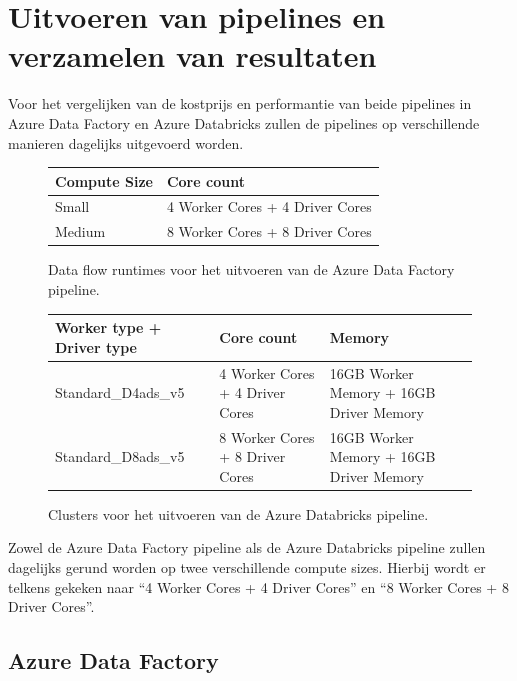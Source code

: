 \chapter{Uitvoeren van pipelines en verzamelen van resultaten}%
\label{ch:uitvoeren}

Voor het vergelijken van de kostprijs en performantie van beide pipelines in Azure Data Factory en Azure Databricks zullen de pipelines op verschillende manieren dagelijks uitgevoerd worden.

\begin{figure}[H]%
    \centering
    \begin{tabularx}{0.9\textwidth}{ |X|X| }
        \hline
        \textbf{Compute Size} & \textbf{Core count} \\
        \hline 
        Small  & 4 Worker Cores + 4 Driver Cores  \\
        \hline
        Medium & 8 Worker Cores + 8 Driver Cores \\
        \hline
    \end{tabularx}
    \caption{Data flow runtimes voor het uitvoeren van de Azure Data Factory pipeline.}
\end{figure}
    
\begin{figure}[H]%
    \centering
    \begin{tabularx}{0.9\textwidth}{ |X|X|X| }
        \hline
        \textbf{Worker type + Driver type} & \textbf{Core count} & \textbf{Memory} \\
        \hline 
        Standard\_D4ads\_v5 & 4 Worker Cores + 4 Driver Cores & 16GB Worker Memory + 16GB Driver Memory  \\
        \hline
        Standard\_D8ads\_v5 & 8 Worker Cores + 8 Driver Cores & 16GB Worker Memory + 16GB Driver Memory  \\
        \hline
    \end{tabularx}
    \caption{Clusters voor het uitvoeren van de Azure Databricks pipeline.}
\end{figure}

Zowel de Azure Data Factory pipeline als de Azure Databricks pipeline zullen dagelijks gerund worden op twee verschillende compute sizes. Hierbij wordt er telkens gekeken naar ``4 Worker Cores + 4 Driver Cores'' en ``8 Worker Cores + 8 Driver Cores''.

\section{Azure Data Factory}


